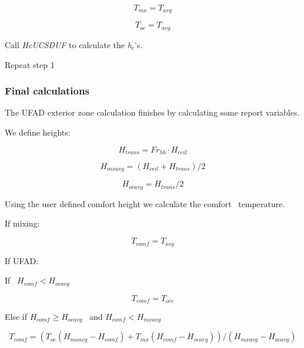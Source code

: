 \begin{equation}
{T_{mx}} = {T_{avg}}
\end{equation}

\begin{equation}
{T_{oc}} = {T_{avg}}
\end{equation}

Call \emph{HcUCSDUF} to calculate the \emph{h\(_{c}\)}'s.

Repeat step 1

\subsubsection{Final calculations}\label{final-calculations-2}

The UFAD exterior zone calculation finishes by calculating some report variables.

We define heights:

\begin{equation}
{H_{trans}} = F{r_{hb}} \cdot {H_{ceil}}
\end{equation}

\begin{equation}
{H_{mxavg}} = \left( {{H_{ceil}} + {H_{trans}}} \right)/2
\end{equation}

\begin{equation}
{H_{ocavg}} = {H_{trans}}/2
\end{equation}

Using the user defined comfort height we calculate the comfort~ temperature.

If mixing:

\begin{equation}
{T_{comf}} = {T_{avg}}
\end{equation}

If UFAD:

If~ \({H_{comf}} < {H_{ocavg}}\)

\begin{equation}
{T_{comf}} = {T_{occ}}
\end{equation}

Else if \({H_{comf}} \ge {H_{ocavg}}\) ~and \({H_{comf}} < {H_{mxavg}}\)

\begin{equation}
{T_{comf}} = \left( {{T_{oc}}\left( {{H_{mxavg}} - {H_{comf}}} \right) + {T_{mx}}\left( {{H_{comf}} - {H_{ocavg}}} \right)} \right)/\left( {{H_{mxavg}} - {H_{ocavg}}} \right)
\end{equation}

